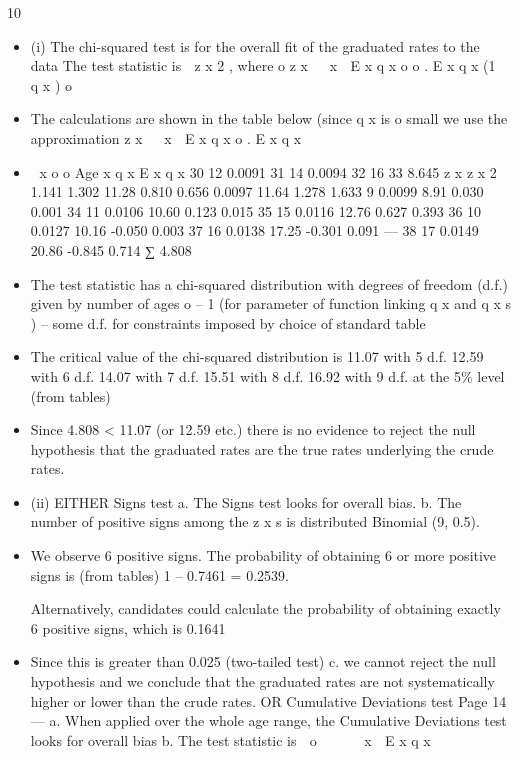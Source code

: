 \documentclass[a4paper,12pt]{article}
\begin{document}
\begin{enumerate}
10
\begin{itemize}
\item (i) The chi-squared test is for the overall fit of the graduated rates to the data
The test statistic is
 z x 2 , where
o
z x 
 x  E x q x
o
o
.
E x q x (1  q x )
o
\item The calculations are shown in the table below (since q x is
o
small we use the approximation z x 
 x  E x q x
o
.
E x q x
\item %
 x o o
Age x q x E x q x
30 12 0.0091 31 14 0.0094 32 16 33
8.645
z x
z x 2
1.141 1.302
11.28 0.810 0.656
0.0097 11.64 1.278 1.633
9 0.0099 8.91 0.030 0.001
34 11 0.0106 10.60 0.123 0.015
35 15 0.0116 12.76 0.627 0.393
36 10 0.0127 10.16 -0.050 0.003
37 16 0.0138 17.25 -0.301 0.091  — %
38
17
0.0149
20.86
-0.845
0.714
∑
4.808
\item The test statistic has a chi-squared distribution with degrees of freedom (d.f.)
given by number of ages
o
– 1 (for parameter of function linking q x and q x s )
– some d.f. for constraints imposed by choice of standard table
\item The critical value of the chi-squared distribution is
11.07 with 5 d.f.
12.59 with 6 d.f.
14.07 with 7 d.f.
15.51 with 8 d.f.
16.92 with 9 d.f. at the 5\% level (from tables)
\item Since 4.808 < 11.07 (or 12.59 etc.) there is no evidence to reject the null
hypothesis that the graduated rates are the true rates underlying the crude
rates.
\item (ii)
EITHER
Signs test
a. The Signs test looks for overall bias.
b. The number of positive signs among the z x s
is distributed Binomial (9, 0.5).
\item We observe 6 positive signs.
The probability of obtaining 6 or more positive signs is
(from tables)
1 – 0.7461 = 0.2539.
\item [Alternatively, candidates could calculate the probability of obtaining exactly 6
positive signs, which is 0.1641]
\item Since this is greater than 0.025 (two-tailed test)
c. we cannot reject the null hypothesis and we conclude that the
graduated rates are not systematically higher or lower than the crude
rates.
OR
Cumulative Deviations test
Page 14  — %
a. When applied over the whole age range, the Cumulative Deviations
test looks for overall bias
b. The test statistic is

o

    x  E x q x  

\end{itemize}
\end{enumerate}
\end{document}
